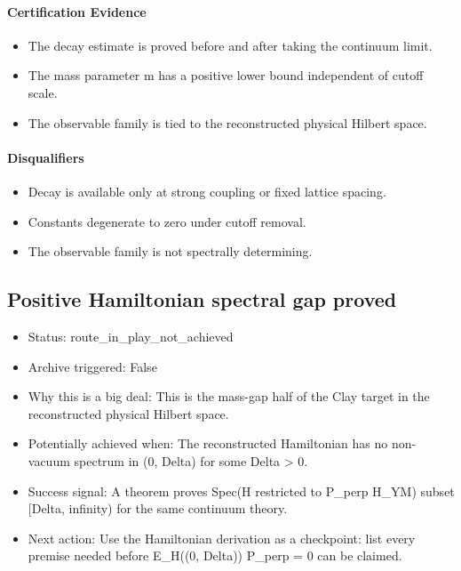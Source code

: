 \documentclass[11pt]{article}
\begin{document}
\paragraph{Certification Evidence}

\begin{itemize}
\item The decay estimate is proved before and after taking the continuum limit.
\item The mass parameter m has a positive lower bound independent of cutoff scale.
\item The observable family is tied to the reconstructed physical Hilbert space.
\end{itemize}

\paragraph{Disqualifiers}

\begin{itemize}
\item Decay is available only at strong coupling or fixed lattice spacing.
\item Constants degenerate to zero under cutoff removal.
\item The observable family is not spectrally determining.
\end{itemize}

\subsection*{Positive Hamiltonian spectral gap proved}

\begin{itemize}
\item Status: route\_in\_play\_not\_achieved
\item Archive triggered: False
\item Why this is a big deal: This is the mass-gap half of the Clay target in the reconstructed physical Hilbert space.
\item Potentially achieved when: The reconstructed Hamiltonian has no non-vacuum spectrum in (0, Delta) for some Delta > 0.
\item Success signal: A theorem proves Spec(H restricted to P\_perp H\_YM) subset [Delta, infinity) for the same continuum theory.
\item Next action: Use the Hamiltonian derivation as a checkpoint: list every premise needed before E\_H((0, Delta)) P\_perp = 0 can be claimed.
\end{itemize}
\end{document}
